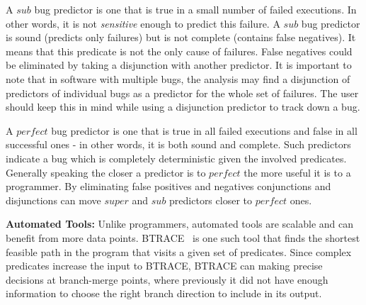 A $sub$ bug predictor is one that is true in a small number of failed executions.  In other words, it is not {\em sensitive} enough to predict this failure.  A $sub$ bug predictor is sound (predicts only failures) but is not complete (contains false negatives).  It means that this predicate is not the only cause of failures.  False negatives could be eliminated by taking a disjunction with another predictor.  It is important to note that in software with multiple bugs, the analysis may find a disjunction of predictors of individual bugs as a predictor for the whole set of failures.  The user should keep this in mind while using a disjunction predictor to track down a bug.

A $perfect$ bug predictor is one that is true in all failed executions and false in all successful ones - in other words, it is both sound and complete.  Such predictors indicate a bug which is completely deterministic given the involved predicates.  Generally speaking the closer a predictor is to $perfect$ the more useful it is to a programmer.  By eliminating false positives and negatives conjunctions and disjunctions can move $super$ and $sub$ predictors closer to $perfect$ ones.

\vspace{4pt} \noindent
{\bf Automated Tools:}  Unlike programmers, automated tools are scalable and can benefit from more data points.  BTRACE~\cite{Lal:2006:POPAD} is one such tool that finds the shortest feasible path in the program that visits a given set of predicates.  Since complex predicates increase the input to BTRACE, BTRACE can making precise decisions at branch-merge points, where previously it did not have enough information to choose the right branch direction to include in its output.
